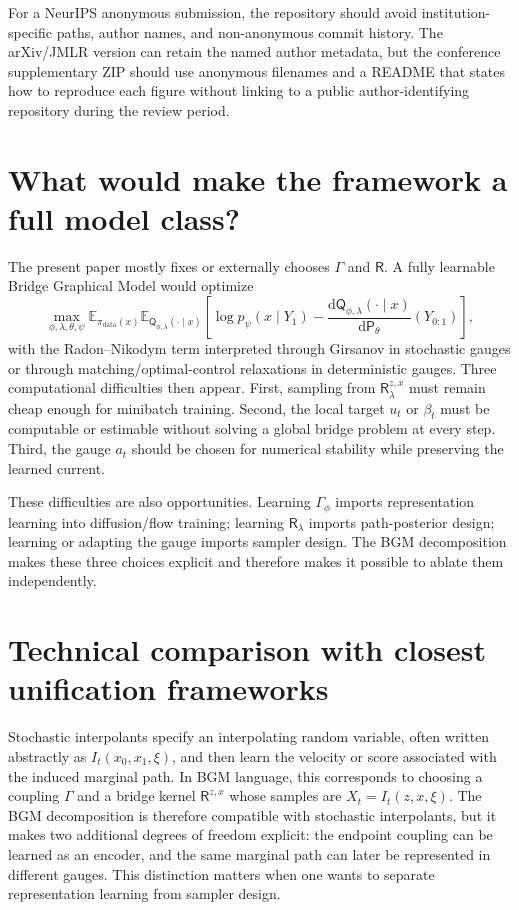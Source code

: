 \documentclass{article}
\numberwithin{equation}{section}
\newcommand{\E}{\mathbb{E}}
\newcommand{\dd}{\mathrm{d}}
\newcommand{\pdata}{\pi_{\mathrm{data}}}
\newcommand{\scrR}{\mathsf{R}}
\newcommand{\scrP}{\mathsf{P}}
\newcommand{\scrQ}{\mathsf{Q}}
\begin{document}
For a NeurIPS anonymous submission, the repository should avoid institution-specific paths, author names, and non-anonymous commit history. The arXiv/JMLR version can retain the named author metadata, but the conference supplementary ZIP should use anonymous filenames and a README that states how to reproduce each figure without linking to a public author-identifying repository during the review period.

\section{What would make the framework a full model class?}
\label{app:model_class}

The present paper mostly fixes or externally chooses \(\Gamma\) and \(\scrR\). A fully learnable Bridge Graphical Model would optimize
\begin{equation}
    \max_{\phi,\lambda,\theta,\psi}
    \E_{\pdata(x)}\E_{\scrQ_{\phi,\lambda}(\cdot\mid x)}
    \left[\log p_\psi(x\mid Y_1)-\frac{\dd \scrQ_{\phi,\lambda}(\cdot\mid x)}{\dd \scrP_\theta}(Y_{0:1})\right],
\end{equation}
with the Radon--Nikodym term interpreted through Girsanov in stochastic gauges or through matching/optimal-control relaxations in deterministic gauges. Three computational difficulties then appear. First, sampling from \(\scrR_\lambda^{z,x}\) must remain cheap enough for minibatch training. Second, the local target \(u_t\) or \(\beta_t\) must be computable or estimable without solving a global bridge problem at every step. Third, the gauge \(a_t\) should be chosen for numerical stability while preserving the learned current.

These difficulties are also opportunities. Learning \(\Gamma_\phi\) imports representation learning into diffusion/flow training; learning \(\scrR_\lambda\) imports path-posterior design; learning or adapting the gauge imports sampler design. The BGM decomposition makes these three choices explicit and therefore makes it possible to ablate them independently.


\section{Technical comparison with closest unification frameworks}
\label{app:comparison}

Stochastic interpolants specify an interpolating random variable, often written abstractly as \(I_t(x_0,x_1,\xi)\), and then learn the velocity or score associated with the induced marginal path. In BGM language, this corresponds to choosing a coupling \(\Gamma\) and a bridge kernel \(\scrR^{z,x}\) whose samples are \(X_t=I_t(z,x,\xi)\). The BGM decomposition is therefore compatible with stochastic interpolants, but it makes two additional degrees of freedom explicit: the endpoint coupling can be learned as an encoder, and the same marginal path can later be represented in different gauges. This distinction matters when one wants to separate representation learning from sampler design.
\end{document}
